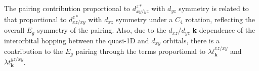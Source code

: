 \documentclass[%
reprint,
superscriptaddress,
 amsmath,amssymb,
 aps,
prb,
nobalancelastpage,
]{revtex4-2}
\begin{document}
The pairing contribution proportional to $d_{xy/yz}^{z*}$ with $d_{yz}$ symmetry is related to that proportional to $d_{xz/xy}^{z*}$ with $d_{xz}$ symmetry under a $C_{4}$ rotation, reflecting the overall $E_{g}$ symmetry of the pairing. Also, due to the $d_{xz}/d_{yz}$ \textbf{k} dependence of the interorbital hopping between the quasi-1D and $d_{xy}$ orbitals, there is a contribution to the $E_{g}$ pairing through the terms proportional to $\lambda t_{\textbf{k}}^{xz/xy}$ and $\lambda t_{\textbf{k}}^{yz/xy}$.
\end{document}
